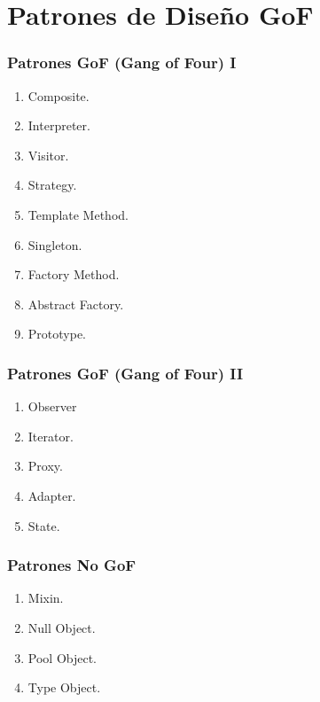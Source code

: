 ﻿\documentclass[animated,a4paper,slidestop,xcolor=pst,blue]{beamer}
\begin{document}
\section{Patrones de Diseño GoF}

\begin{frame}[c]
	\frametitle{Patrones GoF (Gang of Four) I}
	\begin{enumerate}
		\item Composite.
		\item Interpreter.
		\item Visitor.
		\item Strategy.
		\item Template Method.
        \item Singleton.
        \item Factory Method.
        \item Abstract Factory.
        \item Prototype.
	\end{enumerate}
\end{frame}

\begin{frame}[c]
	\frametitle{Patrones GoF (Gang of Four) II}
	\begin{enumerate}
        \item Observer
        \item Iterator.
        \item Proxy.
        \item Adapter.
        \item State.
	\end{enumerate}
\end{frame}

\begin{frame}[c]
	\frametitle{Patrones No GoF}
	\begin{enumerate}
		\item Mixin.
        \item Null Object.
		\item Pool Object.
        \item Type Object.
	\end{enumerate}
\end{frame}
\end{document}
